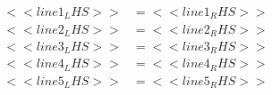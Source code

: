 \noindent{(\theminipagecount)}\hspace{0.1mm} %
\begin{minipage}[t]{0.45\textwidth} %
    \vspace{-26pt}  %
    \raggedright %
    \begin{align*} %
        <<line1_LHS>> &= <<line1_RHS>>\\
        <<line2_LHS>> &= <<line2_RHS>>\\
        <<line3_LHS>> &= <<line3_RHS>>\\
        <<line4_LHS>> &= <<line4_RHS>>\\
        <<line5_LHS>> &= <<line5_RHS>>\\
    \end{align*}
\end{minipage}